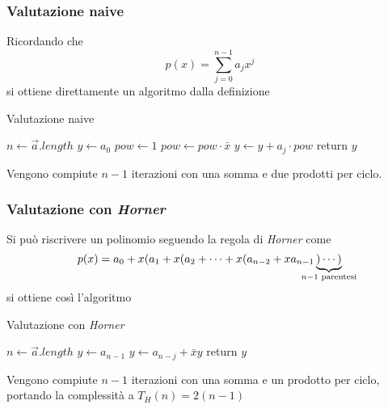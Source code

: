\subsubsection{Valutazione naive}
Ricordando che
    \begin{equation*}
        p(x) = \sum_{j=0}^{n-1}a_j x^j
    \end{equation*}
si ottiene direttamente un algoritmo dalla definizione
\begin{algorithm}[H]
\caption{Valutazione naive}\label{alg:valnaive}
\begin{algorithmic}[1]
        \State $n \gets \vec{a}.length$
        \State $y \gets a_0$
        \State $pow \gets 1$
            \State $pow \gets pow \cdot \bar{x}$
            \State $y \gets y + a_j \cdot pow$
        \EndFor
        \State return $y$
    \EndProcedure
\end{algorithmic}
\end{algorithm}
Vengono compiute $n-1$ iterazioni con una somma e due prodotti per ciclo.

\subsubsection{Valutazione con \textit{Horner}}
Si può riscrivere un polinomio seguendo la regola di \textit{Horner} come 
    \begin{equation*}
        p(x) = a_0 + x ( a_1 + x ( a_2 + \cdots + x 
        ( a_{n-2} + x a_{n-1} 
        \underbrace{ ) \cdots ) }_{\mathclap{ n-1 \text{ parentesi} } }
    \end{equation*}
si ottiene così l'algoritmo
\begin{algorithm}[H]
    \caption{Valutazione con \textit{Horner}}\label{alg:valhorner}
\begin{algorithmic}[1]
        \State $n \gets \vec{a}.length$
        \State $y \gets a_{n-1}$
            \State $y \gets a_{n-j} + \bar{x}y$
        \EndFor
        \State return $y$
    \EndProcedure
\end{algorithmic}
\end{algorithm}
Vengono compiute $n-1$ iterazioni con una somma e un prodotto per ciclo, portando la complessità a $T_H(n) = 2(n-1)$

